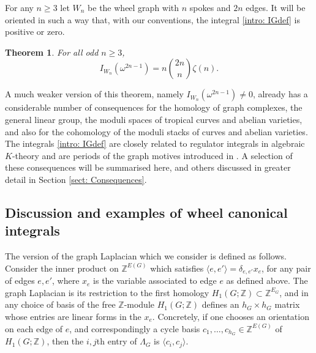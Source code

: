 \documentclass[10pt]{amsart}
\newcommand{\ZZ}{{\mathbb Z}}
\theoremstyle{plain}
\newtheorem{thm}{Theorem}
\newcommand{\0}{\color{blue}{\mathsf{0}}}
\begin{document}
For any $n \geq 3$ let $W_n$ be the wheel graph with $n$ spokes and $2n$ edges. It will be oriented in such a way that, with our conventions, the integral \eqref{intro: IGdef} is positive or zero. 
    
\begin{thm} \label{thm: introMain} 
For all odd $n\geq 3$,
\begin{equation}\label{wheelseq} 
I_{W_n}(\omega^{2n-1})=n\genfrac(){0pt}{}{2n}{n}\zeta(n).
\end{equation}
\end{thm}
A much  weaker version of this theorem, namely $I_{W_n}(\omega^{2n-1})\neq 0$, already has a considerable number of consequences for the homology of graph complexes, the general linear group, the moduli spaces of tropical curves and abelian varieties, and also for the cohomology of the moduli stacks of curves and abelian varieties. The integrals \eqref{intro: IGdef} are closely related to regulator integrals in algebraic $K$-theory and  are periods of the graph motives introduced in \cite{BEK}. A selection of these consequences will be summarised  here, and  others discussed in greater detail in Section \ref{sect: Consequences}.  

\subsection{Discussion and examples of wheel canonical integrals} \label{sect:1point1}
The version of the graph Laplacian which we consider is defined as follows. Consider the inner product  on $\ZZ^{E(G)}$ which satisfies
$\langle e, e'\rangle = \delta_{e,e'} x_e$, for any pair of edges $e,e'$,  where $x_e$ is the variable associated to edge $e$ as defined above. The graph Laplacian is its restriction to the first homology $H_1(G;\ZZ) \subset \ZZ^{E_G}$, and in any choice of basis of  the free $\ZZ$-module $H_1(G;\ZZ)$ defines an $h_G \times h_G$ matrix whose entries are linear forms in the $x_e.$ Concretely, 
if one chooses an orientation on each edge of $e$, and correspondingly  a cycle basis $c_1,\ldots, c_{h_G} \in \ZZ^{E(G)}$ of $H_1(G;\ZZ)$, then the $i,j$th entry of $\Lambda_G$ is $\langle c_i, c_j\rangle$. 
\end{document}
